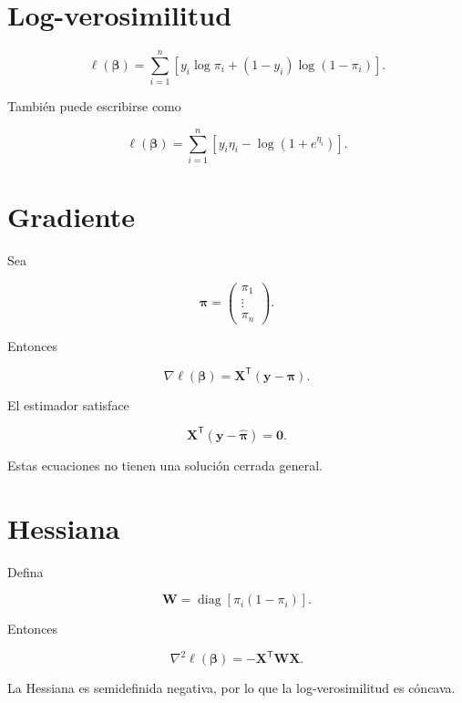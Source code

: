 \documentclass[
  spanish,
  10.5pt,
  letterpaper,
  DIV=11,
  numbers=noendperiod,
  oneside,
  open=any]{scrreprt}
\theoremstyle{definition}
\theoremstyle{definition}
\theoremstyle{plain}
\theoremstyle{remark}
\begin{document}
\section*{Log-verosimilitud}\label{log-verosimilitud-1}


\[
\ell(\boldsymbol{\beta})
=
\sum_{i=1}^{n}
\left[
y_i\log\pi_i
+
(1-y_i)\log(1-\pi_i)
\right].
\]

También puede escribirse como

\[
\ell(\boldsymbol{\beta})
=
\sum_{i=1}^{n}
\left[
y_i\eta_i
-
\log(1+e^{\eta_i})
\right].
\]

\section*{Gradiente}\label{gradiente-1}


Sea

\[
\boldsymbol{\pi}
=
\begin{pmatrix}
\pi_1\\
\vdots\\
\pi_n
\end{pmatrix}.
\]

Entonces

\[
\nabla\ell(\boldsymbol{\beta})
=
\mathbf{X}^{\mathsf T}
(\mathbf{y}-\boldsymbol{\pi}).
\]

El estimador satisface

\[
\mathbf{X}^{\mathsf T}
(\mathbf{y}-\widehat{\boldsymbol{\pi}})
=
\mathbf{0}.
\]

Estas ecuaciones no tienen una solución cerrada general.

\section*{Hessiana}\label{hessiana}


Defina

\[
\mathbf{W}
=
\operatorname{diag}
\left[
\pi_i(1-\pi_i)
\right].
\]

Entonces

\[
\nabla^2\ell(\boldsymbol{\beta})
=
-\mathbf{X}^{\mathsf T}\mathbf{W}\mathbf{X}.
\]

La Hessiana es semidefinida negativa, por lo que la log-verosimilitud es
cóncava.
\end{document}
